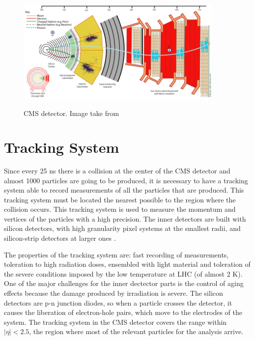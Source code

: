 
 \begin{figure}[h]
 \centering
 \caption{CMS detector. Image take from \cite{CMS_detector_slice}}
 \includegraphics[width=0.9\textwidth]{./Capitulos/CMS/CMS}  
 \label{CMS_detector}
 \end{figure}

\section{Tracking System}

Since every 25 ns there is a collision at the center of the CMS detector and almost 1000 particles are going to be produced, it is necessary to have a tracking system able to record measurements 
of all the particles that are produced. This tracking system must be located the nearest possible to the region where the collision occurs. This tracking system is used to measure the momentum and 
vertices of the particles with a high precision. The inner detectors are built with silicon detectors, with high granularity pixel systems at the smallest radii, and silicon-strip detectors at 
larger ones \cite{Perspectives_LHC}.

The properties of the tracking system are: fast recording of measurements, toleration to high radiation doses, ensembled with light material and toleration of the severe conditions imposed by the low temperature at LHC (of almost 2 K). One of the major challenges for the inner dectector parts is the control of aging effects because the damage produced by irradiation is severe. The silicon detectors are p-n junction diodes, so when a particle crosses the detector, it causes the liberation of electron-hole pairs, which move to the electrodes of the system. The tracking system in the CMS detector covers the range within $|\eta|<2.5$, the region where most of the relevant particles for the analysis arrive. 

